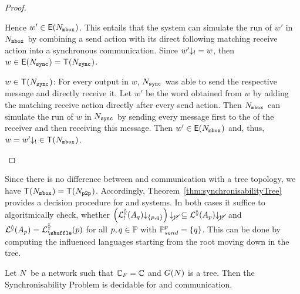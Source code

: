 \documentclass[submission,copyright,creativecommons,UKenglish]{eptcs}
\begin{document}
\begin{proof}
\begin{compactdesc}
\begin{compactdesc}
\begin{compactdesc}
					\end{compactdesc}
					Hence $ w' \in \mathsf{E}(N_{{\mathtt{mbox}}^{ }}) $.
					This entails that the \Synchronous system can simulate the run of $ w' $ in $ N_{{\mathtt{mbox}}^{ }} $ by combining a send action with its direct following matching receive action into a synchronous communication.
					Since $ w'{\downarrow_{!}} = w $, then $ w \in \mathsf{E}(N_{{\mathtt{sync}}^{}}) = \mathsf{T}(N_{{\mathtt{sync}}^{}}) $.
				\item[$ w \in \mathsf{T}(N_{{\mathtt{sync}}^{}}) $:] For every output in $ w $, $ N_{{\mathtt{sync}}^{}} $ was able to send the respective message and directly receive it.
					Let $ w' $ be the word obtained from $ w $ by adding the matching receive action directly after every send action.
					Then $ N_{{\mathtt{mbox}}^{ }} $ can simulate the run of $ w $ in $ N_{{\mathtt{sync}}^{}} $ by sending every message first to the \Mailbox of the receiver and then receiving this message.
					Then \mbox{$ w' \in \mathsf{E}(N_{{\mathtt{mbox}}^{ }}) $} and, thus, $ w = w'{\downarrow_{!}} \in \mathsf{T}(N_{{\mathtt{mbox}}^{ }}) $. \qedhere
			\end{compactdesc}
	\end{compactdesc}
\end{proof}

Since there is no difference between \Mailbox and \Ptp communication with a tree topology, we have $ \mathsf{T}(N_{{\mathtt{mbox}}^{}}) = \mathsf{T}(N_{{\mathtt{p2p}}^{}}) $.
Accordingly, Theorem~\ref{thm:synchronisabilityTree} provides a decision procedure for \Mailbox and \Ptp systems.
In both cases it suffice to algoritmically check, whether $ \left( \mathcal{L}_{!}^{\between}{\left( A_{q} \right)}{\downarrow_{{\left\lbrace p, q \right\rbrace}}} \right){\downarrow_{\cancel{!?}}} \subseteq \mathcal{L}^{\between}{\left( A_{p} \right)}{\downarrow_{\cancel{!?}}} $ and $ \LangTree{\Automaton{p}} = \LangShuffle{p} $ for all $ p, q \in \mathbb{P} $ with $ \mathbb{P}_{send}^{p} = {\left\lbrace q \right\rbrace} $.
This can be done by computing the influenced languages starting from the root moving down in the tree.

\begin{corollary}
	Let $ N $ be a network such that $\mathbb{C}_F = \mathbb{C}$ and $ G(N) $ is a tree.
	Then the Synchronisability Problem is decidable for \Ptp and \Mailbox communication.
\end{corollary}
\end{document}
